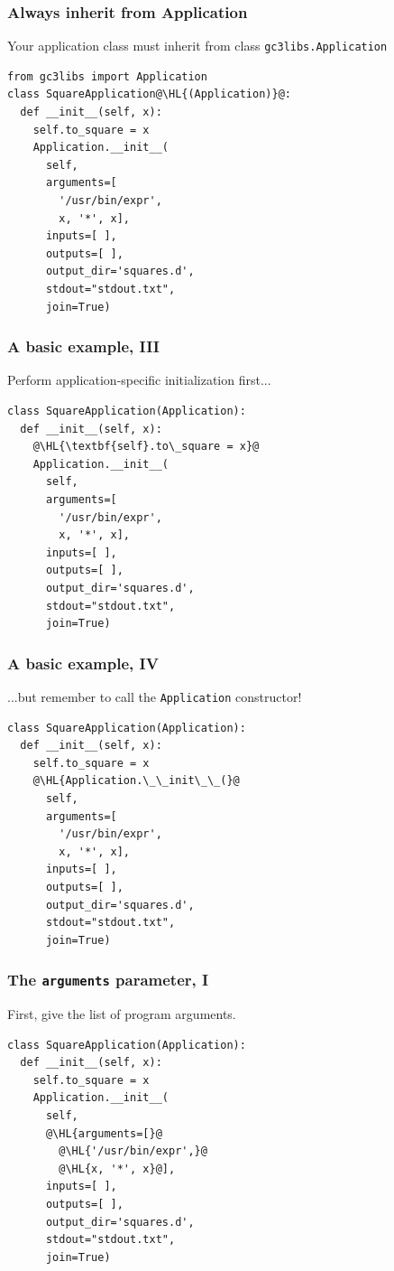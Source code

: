 \documentclass[english,serif,mathserif,xcolor=pdftex,dvipsnames,table]{beamer}
\begin{document}
\begin{frame}[fragile]
\frametitle{Always inherit from Application}

  Your application class must inherit from class \texttt{gc3libs.Application}
  \+
\begin{lstlisting}
from gc3libs import Application
class SquareApplication@\HL{(Application)}@:
  def __init__(self, x):
    self.to_square = x
    Application.__init__(
      self,
      arguments=[
        '/usr/bin/expr', 
        x, '*', x],
      inputs=[ ],
      outputs=[ ],
      output_dir='squares.d',
      stdout="stdout.txt",
      join=True)
\end{lstlisting}
\end{frame}


\begin{frame}[fragile]
\frametitle{A basic example, III}

  Perform application-specific initialization first...
  \+
\begin{lstlisting}
class SquareApplication(Application):
  def __init__(self, x):
    @\HL{\textbf{self}.to\_square = x}@
    Application.__init__(
      self,
      arguments=[
        '/usr/bin/expr', 
        x, '*', x],
      inputs=[ ],
      outputs=[ ],
      output_dir='squares.d',
      stdout="stdout.txt",
      join=True)
\end{lstlisting}
\end{frame}

\begin{frame}[fragile]
\frametitle{A basic example, IV}

  ...but remember to call the \lstinline|Application| constructor!
  \+
\begin{lstlisting}
class SquareApplication(Application):
  def __init__(self, x):
    self.to_square = x
    @\HL{Application.\_\_init\_\_(}@
      self,
      arguments=[
        '/usr/bin/expr', 
        x, '*', x],
      inputs=[ ],
      outputs=[ ],
      output_dir='squares.d',
      stdout="stdout.txt",
      join=True)
\end{lstlisting}
\end{frame}

\begin{frame}[fragile]
\frametitle{The \texttt{arguments} parameter, I}

  First, give the list of program arguments.

  \+
\begin{lstlisting}
class SquareApplication(Application):
  def __init__(self, x):
    self.to_square = x
    Application.__init__(
      self,
      @\HL{arguments=[}@
        @\HL{'/usr/bin/expr',}@
        @\HL{x, '*', x}@],
      inputs=[ ],
      outputs=[ ],
      output_dir='squares.d',
      stdout="stdout.txt",
      join=True)
\end{lstlisting}
\end{frame}
\end{document}
